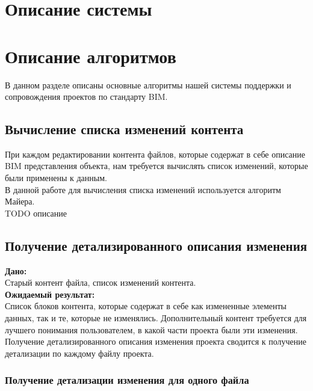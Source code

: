 \documentclass[a4paper,14pt]{extreport} %
\begin{document}
\newpage
\section{Описание системы}


\newpage
\section{Описание алгоритмов}
В данном разделе описаны основные алгоритмы нашей системы поддержки и сопровождения проектов по стандарту BIM.

\subsection{Вычисление списка изменений контента} 
При каждом редактировании контента файлов, которые содержат в себе описание BIM представления объекта, нам требуется вычислять список изменений, которые были применены к данным. \\
В данной работе для вычисления списка изменений используется алгоритм Майера. \\
TODO описание

\newpage
\subsection{Получение детализированного описания изменения} 
\textbf{Дано:} \\
Старый контент файла, список изменений контента. \\
\textbf{Ожидаемый результат:} \\
Список блоков контента, которые содержат в себе как измененные элементы данных, так и те, которые не изменялись. Дополнительный контент требуется для лучшего понимания пользователем, в какой части проекта были эти изменения. \\
Получение детализированного описания изменения проекта сводится к получение детализации по каждому файлу проекта.

\subsubsection{Получение детализации изменения для одного файла}
\end{document}
